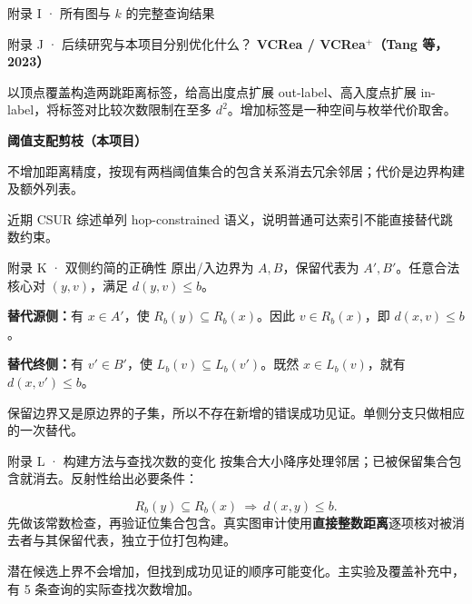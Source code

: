 \begin{frame}{附录 I · 所有图与 $k$ 的完整查询结果}

\end{frame}

\begin{frame}{附录 J · 后续研究与本项目分别优化什么？}
\fontsize{11}{14}\selectfont
\textbf{VCRea / VCRea$^+$（Tang 等，2023）}\par
以顶点覆盖构造两跳距离标签，给高出度点扩展 out-label、高入度点扩展 in-label，将标签对比较次数限制在至多 $d^2$。增加标签是一种空间与枚举代价取舍。\par\vspace{3mm}
\textbf{阈值支配剪枝（本项目）}\par
不增加距离精度，按现有两档阈值集合的包含关系消去冗余邻居；代价是边界构建及额外列表。\par\vspace{2mm}
近期 CSUR 综述单列 hop-constrained 语义，说明普通可达索引不能直接替代跳数约束。
\end{frame}

\begin{frame}{附录 K · 双侧约简的正确性}
\fontsize{11}{14}\selectfont
原出/入边界为 $A,B$，保留代表为 $A',B'$。任意合法核心对 $(y,v)$，满足 $d(y,v)\le b$。\par\vspace{2mm}
\textbf{替代源侧：}有 $x\in A'$，使 $R_b(y)\subseteq R_b(x)$。因此 $v\in R_b(x)$，即 $d(x,v)\le b$。\par\vspace{2mm}
\textbf{替代终侧：}有 $v'\in B'$，使 $L_b(v)\subseteq L_b(v')$。既然 $x\in L_b(v)$，就有 $d(x,v')\le b$。\par\vspace{2mm}
保留边界又是原边界的子集，所以不存在新增的错误成功见证。单侧分支只做相应的一次替代。
\end{frame}

\begin{frame}{附录 L · 构建方法与查找次数的变化}
\fontsize{10.5}{13}\selectfont
按集合大小降序处理邻居；已被保留集合包含就消去。反射性给出必要条件：\par
\[
R_b(y)\subseteq R_b(x)\ \Rightarrow\ d(x,y)\le b .
\]
先做该常数检查，再验证位集合包含。真实图审计使用\textbf{直接整数距离}逐项核对被消去者与其保留代表，独立于位打包构建。\par\vspace{2mm}
潜在候选上界不会增加，但找到成功见证的顺序可能变化。主实验及覆盖补充中，有 5 条查询的实际查找次数增加。
\end{frame}

